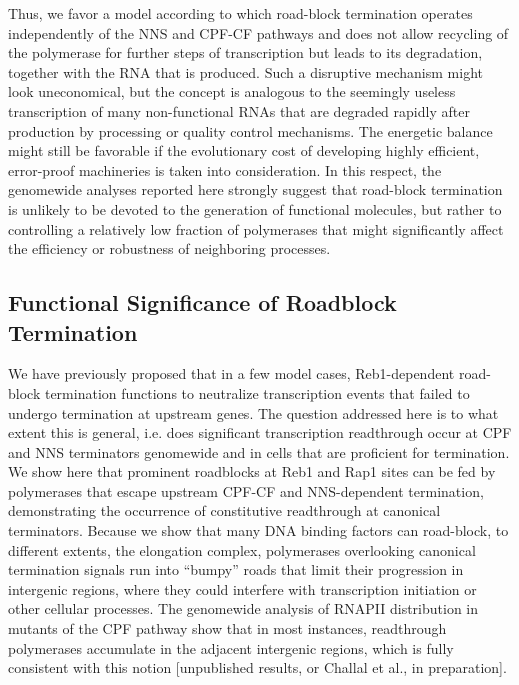 Thus, we favor a model according to which road-block termination operates independently of the NNS and CPF-CF pathways and does not allow recycling of the polymerase for further steps of transcription but leads to its degradation, together with the RNA that is produced. Such a disruptive mechanism might look uneconomical, but the concept is analogous to the seemingly useless transcription of many non-functional RNAs that are degraded rapidly after production by processing or quality control mechanisms. The energetic balance might still be favorable if the evolutionary cost of developing highly efficient, error-proof machineries is taken into consideration. In this respect, the genomewide analyses reported here strongly suggest that road-block termination is unlikely to be devoted to the generation of functional molecules, but rather to controlling a relatively low fraction of polymerases that might significantly affect the efficiency or robustness of neighboring processes.


\singlespacing
\subsection*{Functional Significance of Roadblock Termination}
\doublespacing

We have previously proposed that in a few model cases, Reb1-dependent road-block termination functions to neutralize transcription events that failed to undergo termination at upstream genes. The question addressed here is to what extent this is general, i.e. does significant transcription readthrough occur at CPF and NNS terminators genomewide and in cells that are proficient for termination. We show here that prominent roadblocks at Reb1 and Rap1 sites can be fed by polymerases that escape upstream CPF-CF and NNS-dependent termination, demonstrating the occurrence of constitutive readthrough at canonical terminators. Because we show that many DNA binding factors can road-block, to different extents, the elongation complex, polymerases overlooking canonical termination signals run into “bumpy” roads that limit their progression in intergenic regions, where they could interfere with transcription initiation or other cellular processes. The genomewide analysis of RNAPII distribution in mutants of the CPF pathway show that in most instances, readthrough polymerases accumulate in the adjacent intergenic regions, which is fully consistent with this notion [unpublished results, or Challal et al., in preparation]. 

